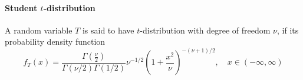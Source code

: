 \paragraph{Student \(t\)-distribution}
A random variable \(T\) is said to have \(t\)-distribution with degree of freedom \(\nu\), if its probability density function
\[f_T(x) = \frac{\Gamma(\frac{\nu}{2})}{\Gamma(\nu / 2)\Gamma(1 / 2)}\nu^{-1/2}\left(1 + \frac{x^2}{\nu}\right)^{-(\nu+1)/2}, \quad x\in (-\infty, \infty)\]